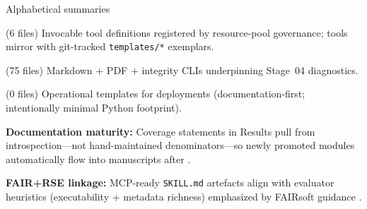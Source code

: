 \documentclass[
  ignorenonframetext,
]{beamer}
\begin{document}
\begin{frame}{Alphabetical summaries}
\begin{block}{ (6 files)}
\protect{}\label{infrastructure.tools-6-files}
Invocable tool definitions registered by resource-pool governance; tools
mirror  with git-tracked
\texttt{templates/*} exemplars.
\end{block}

\begin{block}{ (75 files)}
\protect{}\label{infrastructure.validation-75-files}
Markdown + PDF + integrity CLIs underpinning Stage~04 diagnostics.
\end{block}

\begin{block}{ (0 files)}
\protect{}\label{infrastructurelogrotate.d-0-files}
Operational templates for deployments (documentation-first;
intentionally minimal Python footprint).
\end{block}
\end{frame}

\begin{frame}[fragile]
\textbf{Documentation maturity:} Coverage statements in Results pull
from introspection---not hand-maintained denominators---so newly
promoted modules automatically flow into manuscripts after
.

\textbf{FAIR+RSE linkage:} MCP-ready \texttt{SKILL.md} artefacts align
with evaluator heuristics (executability + metadata richness) emphasized
by FAIRsoft guidance .
\end{frame}
\end{document}
